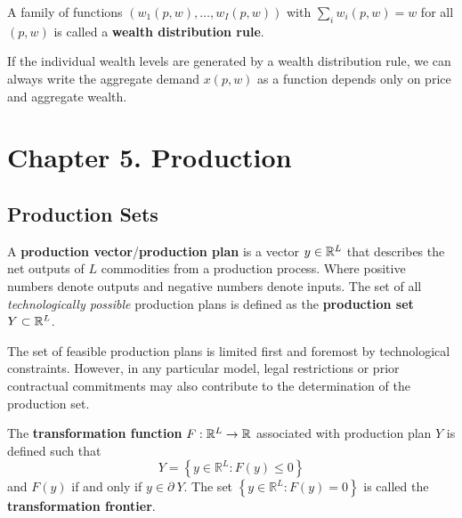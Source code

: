 \documentclass{report}
\begin{document}
	 		\begin{definition}
	 			A family of functions $(w_1(p, w), \dots, w_I(p, w))$ with $\sum_i w_i(p, w) = w$ for all $(p, w)$ is called a \textbf{wealth distribution rule}.
	 		\end{definition}
	 		
	 		\begin{proposition}
	 			If the individual wealth levels are generated by a wealth distribution rule, we can always write the aggregate demand $x(p, w)$ as a function depends only on price and aggregate wealth.
	 		\end{proposition}
	 
	 \section{Chapter 5. Production}
	 	\subsection{Production Sets}
	 		\begin{definition}
	 			A \textbf{production vector}/\textbf{production plan} is a vector $y \in \mathbb{R}^L$ that describes the net outputs of $L$ commodities from a production process. Where positive numbers denote outputs and negative numbers denote inputs. The set of all \emph{technologically possible} production plans is defined as the \textbf{production set} $Y \subset \mathbb{R}^L$.
	 		\end{definition}
	 		
	 		\begin{remark}
	 			The set of feasible production plans is limited first and foremost by technological constraints. However, in any particular model, legal restrictions or prior contractual commitments may also contribute to the determination of the production set.
	 		\end{remark}
	 		
	 		\begin{definition}
	 			The \textbf{transformation function} $F: \mathbb{R}^L \to \mathbb{R}$ associated with production plan $Y$ is defined such that
	 			\begin{equation}
	 				Y=\left\{y \in \mathbb{R}^{L} : F(y) \leq 0\right\}
	 			\end{equation}
	 			and $F(y)$ if and only if $y \in \partial\ Y$. The set $\left\{y \in \mathbb{R}^{L} : F(y)=0\right\}$ is called the \textbf{transformation frontier}.
	 		\end{definition}
	 		
\end{document}
